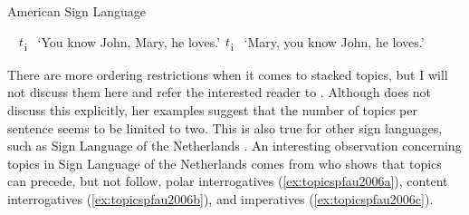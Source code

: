 \begin{exe}
\ex American Sign Language \label{topicstacingasltwo}\begin{xlist}
\ex \textcolor{white}{*}   $\textrm{\textit{t}}$\textsubscript{i}
\glt \textcolor{white}{*}`You know John, Mary, he loves.' \label{ex:topicstacingasltwoa}
\ex *   {$\textrm{\textit{t}}$\textsubscript{i}}
\glt \textcolor{white}{*}`Mary, you know John, he loves.' \label{ex:topicstacingasltwob}
\end{xlist}
\end{exe}

\noindent There are more ordering restrictions when it comes to stacked topics, but I will not discuss them here and refer the interested reader to \citet{aarons1996topics}. Although \citet{aarons1996topics} does not discuss this explicitly, her examples suggest that the number of topics per sentence seems to be limited to two. This is also true for other sign languages, such as Sign Language of the Netherlands \citep{pfau2008topics}. An interesting observation concerning topics in Sign Language of the Netherlands comes from \citet{pfau2008topics} who shows that topics can precede, but not follow, polar interrogatives (\ref{ex:topicspfau2006a}), content interrogatives (\ref{ex:topicspfau2006b}), and imperatives (\ref{ex:topicspfau2006c}).

